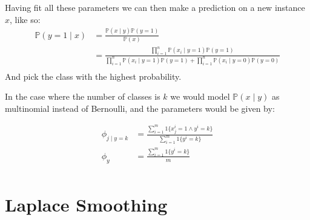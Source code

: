 \documentclass[12pt letter]{report}
\begin{document}
Having fit all these parameters we can then make a prediction on a new instance $x$, like so:
\begin{align*}
  \mathbb{P} \left( y = 1  \mid x \right) & = \frac{\mathbb{P} \left( x  \mid y \right) \mathbb{P} \left( y = 1 \right)
  }{\mathbb{P} \left( x \right) }                                                                                                                    \\
                                          & = \frac{ \prod_{i=1}^{n} \mathbb{P} \left( x_i  \mid y = 1 \right) \mathbb{P} \left( y = 1 \right)    }{
    \prod_{i=1}^{n} \mathbb{P} \left( x_i  \mid y = 1 \right)  \mathbb{P} \left( y = 1 \right) +
    \prod_{i=1}^{n}  \mathbb{P} \left( x_i  \mid  y = 0 \right) \mathbb{P} \left( y = 0 \right)
  }                                                                                                                                                  \\
\end{align*}
And pick the class with the highest probability.

In the case where the number of classes is $k$ we would model $\mathbb{P} \left( x  \mid y \right) $ as multinomial
instead of Bernoulli, and the parameters would be given by:

\begin{align*}
  \phi_{j  \mid y = k} & = \frac{\displaystyle\sum_{i=1}^{m} 1 \{x_j^{i} = 1 \wedge y^{i} = k\}
  }{\displaystyle\sum_{i=1}^{m}1 \{y^{i} = k\} }                                                \\
  \phi_y               & = \frac{\displaystyle\sum_{i=1}^{m} 1 \{y^{i} = k\} }{m}               \\
\end{align*}

\section{Laplace Smoothing}

\end{document}
